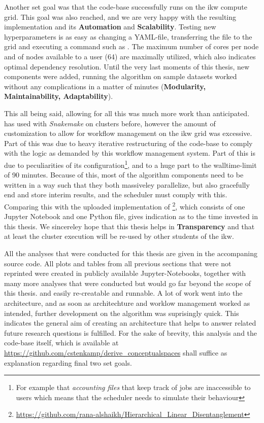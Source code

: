 Another set goal was that the code-base successfully runs on the \gls{ikw} compute grid. This goal was also reached, and we are very happy with the resulting implementation and its \textbf{Automation} and \textbf{Scalability}. Testing new hyperparameters is as easy as changing a YAML-file, transferring the file to the grid and executing a command such as . The maximum number of cores per node and of nodes available to a user (64) are maximally utilized, which also indicates optimal dependency resolution. Until the very last moments of this thesis, new components were added, running the algorithm on sample datasets worked without any complications in a matter of minutes (\textbf{Modularity, Maintainability, Adaptability}).

This all being said, allowing for all this was much more work than anticipated. \me has used with \textit{Snakemake} on clusters before, however the amount of customization to allow for workflow management on the \gls{ikw} grid was excessive. Part of this was due to heavy iterative restructuring of the code-base to comply with the logic as demanded by this workflow management system. Part of this is due to peculiarities of its configuration\footnote{For example that \textit{accounting files} that keep track of jobs are inaccessible to users which means that the scheduler needs to simulate their behaviour}, and to a huge part to the walltime-limit of 90 minutes. Because of this, most of the algorithm components need to be written in a way such that they both massiveley parallelize, but also gracefully end and store interim results, and the scheduler must comply with this. Comparing this with the uploaded implementation of \cite{Alshaikh2020}\footnote{\url{https://github.com/rana-alshaikh/Hierarchical_Linear_Disentanglement}}, which consists of one Jupyter Notebook and one Python file, gives indication as to the time invested in this thesis. We sincereley hope that this thesis helps in \textbf{Transparency} and that at least the cluster execution will be re-used by other students of the \gls{ikw}.

All the analyses that were conducted for this thesis are given in the accompaning source code. All plots and tables from all previous sections that were not reprinted were created in publicly available Jupyter-Notebooks, together with many more analyses that were conducted but would go far beyond the scope of this thesis.  and easily re-creatable and runnable. A lot of work went into the architecture, and as soon as architechture and worklow management worked as intended, further development on the algorithm was suprisingly quick. This indicates the general aim of creating an architecture that helps to answer related future research questions is fulfilled. For the sake of brevity, this analysis and the code-base itself, which is available at \url{https://github.com/cstenkamp/derive_conceptualspaces} shall suffice as explanation regarding final two set goals. 

